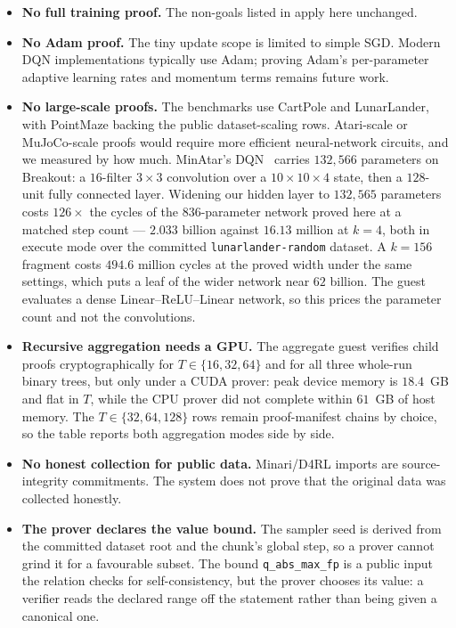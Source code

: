 \begin{itemize}[leftmargin=1.5em]
  \item \textbf{No full training proof.} The non-goals listed in
   apply here unchanged.

  \item \textbf{No Adam proof.} The tiny update scope is limited to simple SGD.
  Modern DQN implementations typically use Adam; proving Adam's per-parameter
  adaptive learning rates and momentum terms remains future work.

  \item \textbf{No large-scale proofs.} The benchmarks use CartPole and
  LunarLander, with PointMaze backing the public dataset-scaling rows.
  Atari-scale or MuJoCo-scale proofs would require more efficient
  neural-network circuits, and we measured by how much. MinAtar's
  DQN~\cite{young2019minatar} carries $132{,}566$ parameters on Breakout: a
  $16$-filter $3\times3$ convolution over a $10\times10\times4$ state, then a
  $128$-unit fully connected layer. Widening our hidden layer to $132{,}565$
  parameters costs $126\times$ the cycles of the $836$-parameter network proved
  here at a matched step count --- $2.033$ billion against $16.13$ million at
  $k = 4$, both in execute mode over the committed
  \texttt{lunarlander-random} dataset. A $k = 156$ fragment costs $494.6$
  million cycles at the proved width under the same settings, which puts a leaf
  of the wider network near $62$ billion. The guest evaluates a dense Linear--ReLU--Linear
  network, so this prices the parameter count and not the convolutions.

  \item \textbf{Recursive aggregation needs a GPU.} The aggregate guest
  verifies child proofs cryptographically for $T \in \{16, 32, 64\}$ and for all
  three whole-run binary trees, but only under a CUDA prover: peak device memory
  is $18.4$~GB and flat in $T$, while the CPU prover did not complete within
  $61$~GB of host memory. The $T \in \{32, 64, 128\}$ rows remain proof-manifest
  chains by choice, so the table reports both aggregation modes side by side.

  \item \textbf{No honest collection for public data.} Minari/D4RL imports
  are source-integrity commitments. The system does not prove that the
  original data was collected honestly.

  \item \textbf{The prover declares the value bound.} The sampler seed is
  derived from the committed dataset root and the chunk's global step, so a
  prover cannot grind it for a favourable subset. The bound
  \texttt{q\_abs\_max\_fp} is a public input the relation checks for
  self-consistency, but the prover chooses its value: a verifier reads the
  declared range off the statement rather than being given a canonical one.


\end{itemize}
